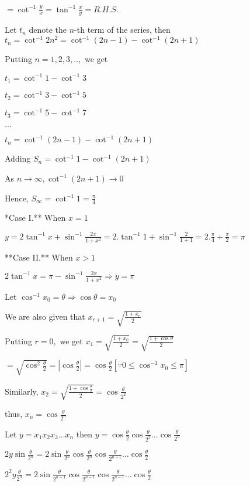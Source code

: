   $= \cot^{-1}\frac{y}{x} = \tan^{-1}\frac{x}{y} = R.H.S.$

\item Let $t_n$ denote the $n$-th term of the series, then $t_n = \cot^{-1}2n^2 = \cot^{-1}(2n - 1) -
  \cot^{-1}(2n + 1)$

  Putting $n = 1,2,3, ..,$ we get

  $t_1 = \cot^{-1}1 - \cot^{-1}3$

  $t_2 = \cot^{-1}3 - \cot^{-1}5$

  $t_3 = \cot^{-1}5 - \cot^{-1}7$

  $\ldots$

  $t_n = \cot^{-1}(2n - 1) - \cot^{-1}(2n + 1)$

  Adding $S_n = \cot^{-1}1 - \cot^{-1}(2n + 1)$

  As $n\rightarrow \infty, \cot^{-1}(2n + 1)\rightarrow 0$

  Hence, $S_\infty = \cot^{-1}1 = \frac{\pi}{4}$

\item **Case I.** When $x = 1$

  $y = 2\tan^{-1}x + \sin^{-1}\frac{2x}{1 + x^2} = 2.\tan^{-1}1 + \sin^{-1}\frac{2}{1 + 1} = 2.\frac{\pi}{4} +
  \frac{\pi}{2} = \pi$

  **Case II.** When $x > 1$

  $2\tan^{-1}x = \pi - \sin^{-1}\frac{2x}{1 + x^2} \Rightarrow y = \pi$

\item Let $\cos^{-1}x_0 = \theta \Rightarrow \cos\theta = x_0$

  We are also given that $x_{r + 1} = \sqrt{\frac{1 + x_r}{2}}$

  Putting $r = 0,$ we get $x_1 = \sqrt{\frac{1 + x_0}{2}} = \sqrt{\frac{1 + \cos\theta}{2}}$

  $= \sqrt{\cos^2\frac{\theta}{2}} = \left|\cos\frac{\theta}{2}\right| = \cos\frac{\theta}{2}[\because
    0\leq\cos^{-1}x_0\leq \pi]$

  Similarly, $x_2 = \sqrt{\frac{1 + \cos\frac{\theta}{2}}{2}} = \cos\frac{\theta}{2^2}$

  thus, $x_n = \cos\frac{\theta}{2^n}$

  Let $y = x_1x_2x_3\ldots x_n$ then $y = \cos\frac{\theta}{2}\cos\frac{\theta}{2^2}\ldots\cos\frac{\theta}{2^n}$

  $2y\sin\frac{\theta}{2^n} = 2\sin\frac{\theta}{2^n}\cos\frac{\theta}{2^n}\cos\frac{\theta}{2^{n -
      1}}\ldots\cos\frac{\theta}{2}$

  $2^2y\frac{\theta}{2^n} = 2\sin\frac{\theta}{2^{n - 1}}\cos\frac{\theta}{2^{n - 1}}\cos\frac{\theta}{2^{n -
      1}}\ldots\cos\frac{\theta}{2}$

